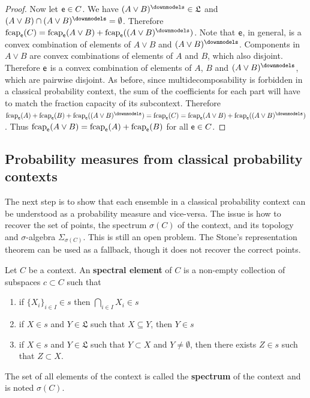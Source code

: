\begin{proof}
		Now let $\mathsf{e} \in C$. We have $(A \vee B)^\separate \in \mathfrak{L}$ and $(A \vee B) \cap (A \vee B)^\separate = \emptyset$. Therefore $\fcap_{\ens}(C) = \fcap_{\ens}(A \vee B)+ \fcap_{\ens}((A \vee B)^\separate)$. Note that $\mathsf{e}$, in general, is a convex combination of elements of $A\vee B$ and $(A \vee B)^\separate$. Components in $A \vee B$ are convex combinations of elements of $A$ and $B$, which also disjoint. Therefore $\mathsf{e}$ is a convex combination of elements of $A$, $B$ and $(A \vee B)^\separate$, which are pairwise disjoint. As before, since multidecomposability is forbidden in a classical probability context, the sum of the coefficients for each part will have to match the fraction capacity of its subcontext. Therefore $\fcap_{\ens}(A) +  \fcap_{\ens}(B) + \fcap_{\ens}((A \vee B)^\separate) = \fcap_{\ens}(C) = \fcap_{\ens}(A \vee B) + \fcap_{\ens}((A \vee B)^\separate)$. Thus $\mathrm{fcap}_{\mathsf{e}}(A \vee B) = \mathrm{fcap}_{\mathsf{e}}(A) +  \mathrm{fcap}_{\mathsf{e}}(B)$ for all $\mathsf{e} \in C$.
	\end{proof}


\subsection{Probability measures from classical probability contexts}

The next step is to show that each ensemble in a classical probability context can be understood as a probability measure and vice-versa. The issue is how to recover the set of points, the spectrum $\sigma(C)$ of the context, and its topology and $\sigma$-algebra $\Sigma_{\sigma(C)}$. This is still an open problem. The Stone's representation theorem can be used as a fallback, though it does not recover the correct points.

\begin{defn}
	Let $C$ be a context. An \textbf{spectral element} of $C$ is a non-empty collection of subspaces $c \subset C$ such that
	\begin{enumerate}
		\item if $\{X_i\}_{i \in I} \in s$ then $\bigcap_{i \in I} X_i \in s$
		\item if $X \in s$ and $Y \in \mathfrak{L}$ such that $X \subseteq Y$, then $Y \in s$
		\item if $X \in s$ and $Y \in \mathfrak{L}$ such that $Y \subset X$ and $Y \neq \emptyset$, then there exists $Z \in s$ such that $Z \subset X$.
	\end{enumerate}
	The set of all elements of the context is called the \textbf{spectrum} of the context and is noted $\sigma(C)$.
\end{defn}

